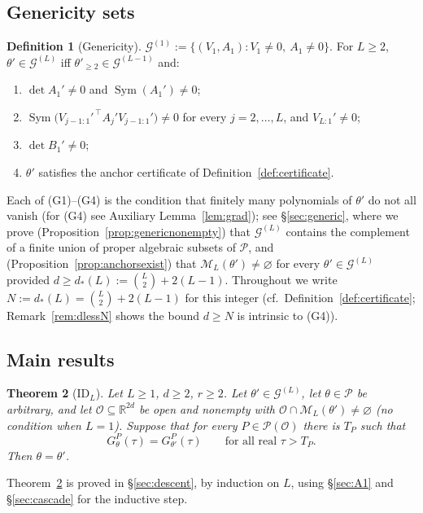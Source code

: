 \documentclass[11pt]{article}
\newtheorem{theorem}{Theorem}[section]
\theoremstyle{definition}
\newtheorem{definition}[theorem]{Definition}
\theoremstyle{remark}
\theoremstyle{plain}
\newcommand{\R}{\mathbb{R}}
\newcommand{\cO}{\mathcal{O}}
\newcommand{\cP}{\mathcal{P}}
\newcommand{\cM}{\mathcal{M}}
\newcommand{\cG}{\mathcal{G}}
\newcommand{\Sym}{\operatorname{Sym}}
\begin{document}
\subsection{Genericity sets}

\begin{definition}[Genericity]\label{def:generic}
$\cG^{(1)}:=\{(V_1,A_1):V_1\neq0,\ A_1\neq0\}$.  For $L\ge2$, $\theta'\in\cG^{(L)}$ iff
$\theta'_{\ge2}\in\cG^{(L-1)}$ and:
\begin{enumerate}
\item[(G1)] $\det A_1'\neq0$ and $\Sym(A_1')\neq0$;
\item[(G2)] $\Sym\!\big(V_{j-1:1}'^{\,\top}A_j'V_{j-1:1}'\big)\neq0$ for every
$j=2,\dots,L$, and $V_{L:1}'\neq0$;
\item[(G3)] $\det B_1'\neq0$;
\item[(G4)] $\theta'$ satisfies the anchor certificate of
Definition~\ref{def:certificate}.
\end{enumerate}
\end{definition}

Each of (G1)--(G4) is the condition that finitely many polynomials of $\theta'$ do not all
vanish (for (G4) see Auxiliary Lemma~\ref{lem:grad}); see \S\ref{sec:generic}, where we
prove (Proposition~\ref{prop:genericnonempty}) that $\cG^{(L)}$ contains the complement of
a finite union of proper algebraic subsets of $\cP$, and
(Proposition~\ref{prop:anchorsexist}) that $\cM_L(\theta')\neq\varnothing$ for every
$\theta'\in\cG^{(L)}$ provided $d\ge d_*(L):=\binom L2+2(L-1)$.  Throughout we write
$N:=d_*(L)=\binom L2+2(L-1)$ for this integer (cf.\ Definition~\ref{def:certificate};
Remark~\ref{rem:dlessN} shows the bound $d\ge N$ is intrinsic to (G4)).

\subsection{Main results}

\begin{theorem}[$\mathrm{ID}_L$]\label{thm:IDL}
Let $L\ge1$, $d\ge2$, $r\ge2$.  Let $\theta'\in\cG^{(L)}$, let $\theta\in\cP$ be arbitrary,
and let $\cO\subseteq\R^{2d}$ be open and nonempty with
$\cO\cap\cM_L(\theta')\neq\varnothing$ (no condition when $L=1$).  Suppose that for every
$P\in\cP(\cO)$ there is $T_P$ such that
\[
G^P_\theta(\tau)=G^P_{\theta'}(\tau)\qquad\text{for all real }\tau>T_P .
\]
Then $\theta=\theta'$.
\end{theorem}

Theorem~\ref{thm:IDL} is proved in \S\ref{sec:descent}, by induction on $L$, using
\S\ref{sec:A1} and \S\ref{sec:cascade} for the inductive step.
\end{document}
